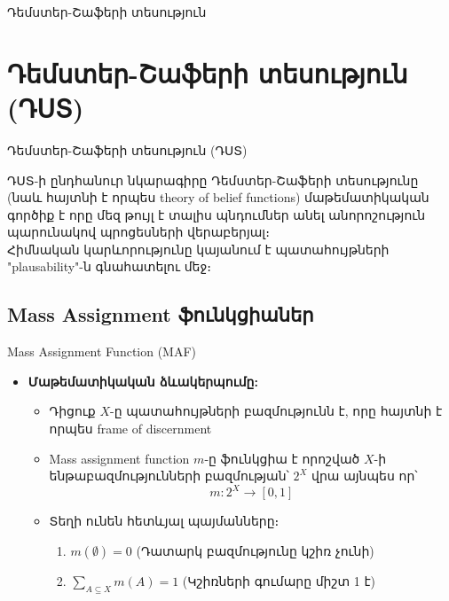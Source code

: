 \documentclass[aspectratio=169]{beamer}
\begin{document}
\begin{frame}
    \begin{center}
        \Huge Դեմստեր-Շաֆերի տեսություն
    \end{center}
\end{frame}

\section{Դեմստեր-Շաֆերի տեսություն (ԴՍՏ)}
\begin{frame}{Դեմստեր-Շաֆերի տեսություն (ԴՍՏ)}
    \begin{block}{ԴՍՏ-ի ընդհանուր նկարագիրը}
        Դեմստեր-Շաֆերի տեսությունը (նաև հայտնի է որպես {\rm theory of belief functions}) մաթեմատիկական գործիք է որը մեզ թույլ է տալիս պնդումներ անել անորոշություն պարունակով պրոցեսների վերաբերյալ։ 
            \vspace{0.5cm}
            \\
        \pause
        Հիմնական կարևորությունը կայանում է պատահույթների {\rm "plausability"}-ն գնահատելու մեջ։     \vspace{0.5cm}
        
    \end{block}
\end{frame}


\subsection{{\rm Mass Assignment} ֆունկցիաներ}
\begin{frame}{{\rm Mass Assignment Function (MAF)}}
  \begin{itemize}
    \item \textbf{Մաթեմատիկական ձևակերպումը:}
      \begin{itemize}
        \item Դիցուք \( X \)-ը պատահույթների բազմությունն է, որը հայտնի է որպես {\rm frame of discernment} \pause
        \item {\rm Mass assignment function} \( m \)-ը ֆունկցիա է որոշված $X$-ի ենթաբազմությունների բազմության՝ \( 2^X \) վրա այնպես որ՝
          \[
          m : 2^X \rightarrow [0, 1]
          \]
        \pause
        \item Տեղի ունեն հետևյալ պայմանները։
          \begin{enumerate}
            \item \( m(\emptyset) = 0 \) (Դատարկ բազմությունը կշիռ չունի)
            \item \( \sum\limits_{A \subseteq X} m(A) = 1 \) (Կշիռների գումարը միշտ 1 է)
          \end{enumerate}
      \end{itemize}
  \end{itemize}
\end{frame}
\end{document}
